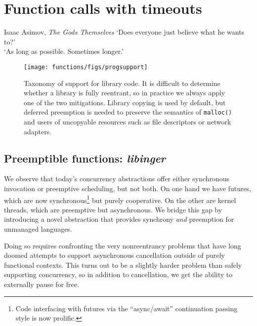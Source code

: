 \chapter{Function calls with timeouts}
\label{chap:functions}

\ifdefined\chapquotes
\begin{chapquote}{Isaac Asimov, \textit{The Gods Themselves}}
`Does everyone just believe what he wants to?' \\
`As long as possible.  Sometimes longer.'
\end{chapquote}
\fi

\begin{figure}
\begin{center}
\texttt{[image: functions/figs/progsupport]}
\end{center}
\caption{Taxonomy of support for library code.  It is difficult to determine whether
a library is fully reentrant, so in practice we always
apply one of the two mitigations.  Library copying is used by default, but deferred
preemption is needed to preserve the semantics of \texttt{malloc()} and users of
uncopyable resources such as file descriptors or network adapters.}
\label{fig:progsupport}
\end{figure}

\begin{swallowsections}
\begin{swallowfigures}

\end{swallowfigures}
\end{swallowsections}





\section{Preemptible functions: \textit{libinger}}

We observe that today's concurrency abstractions offer either synchronous invocation
or preemptive scheduling, but not both.  On one hand we have futures, which are now
synchronous\footnote{Code interfacing with futures via the ``async/await''
continuation passing style is now prolific.} but purely cooperative.  On the other
are kernel threads, which are preemptive but asynchronous.  We bridge this gap by
introducing a novel abstraction that provides synchrony \textit{and} preemption for
unmanaged languages.

Doing so requires confronting the very nonreentrancy problems that have long doomed
attempts to support asynchronous cancellation outside of purely functional contexts.
This turns out to be a slightly harder problem than safely supporting concurrency, so
in addition to cancellation, we get the ability to externally pause for free.

